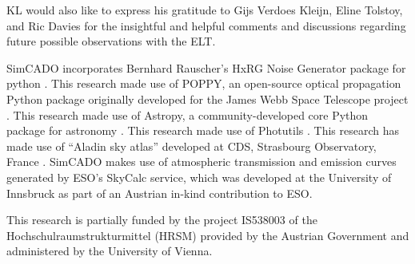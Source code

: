 \begin{acknowledgements}

KL would also like to express his gratitude to Gijs Verdoes Kleijn, Eline Tolstoy, and Ric Davies for the insightful and helpful comments and discussions regarding future possible observations with the ELT.

SimCADO incorporates Bernhard Rauscher's HxRG Noise Generator package for python \citep{nghxrg}. 
This research made use of POPPY, an open-source optical propagation Python package originally developed for the James Webb Space Telescope project \citep{poppy}. 
This research made use of Astropy, a community-developed core Python package for astronomy \citep{astropy, astropy2}. 
This research made use of Photutils \citep{photutils}. 
This research has made use of ``Aladin sky atlas'' developed at CDS, Strasbourg Observatory, France \citep{aladin, aladinlite}.
SimCADO makes use of atmospheric transmission and emission curves generated by ESO's SkyCalc service, which was developed at the University of Innsbruck as part of an Austrian in-kind contribution to ESO. 

This research is partially funded by the project IS538003 of the Hochschulraumstrukturmittel (HRSM) provided by the Austrian Government and administered by the University of Vienna.

\end{acknowledgements}